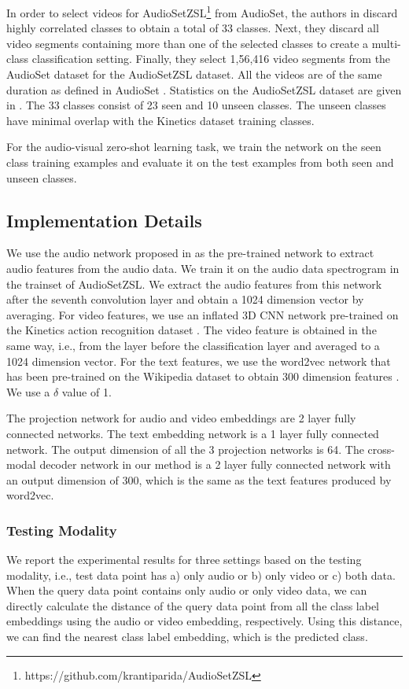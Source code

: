 \documentclass[10pt,twocolumn,letterpaper]{article}
\begin{document}
In order to select videos for AudioSetZSL\footnote{https://github.com/krantiparida/AudioSetZSL} from AudioSet, the authors in \cite{parida2020coordinated} discard highly correlated classes to obtain a total of 33 classes.  Next, they discard all video segments containing more than one of the selected classes to create a multi-class classification setting. Finally, they select 1,56,416 video segments from the AudioSet dataset for the AudioSetZSL dataset. All the videos are of the same duration as defined in AudioSet \cite{gemmeke2017audio}. Statistics on the AudioSetZSL dataset are given in \cite{parida2020coordinated}. The 33 classes consist of 23 seen and 10 unseen classes. The unseen classes have minimal overlap with the Kinetics dataset \cite{carreira2017quo} training classes. 

For the audio-visual zero-shot learning task, we train the network on the seen class training examples and evaluate it on the test examples from both seen and unseen classes.


\subsection{Implementation Details}
We use the audio network proposed in \cite{kumar2018knowledge} as the pre-trained network to extract audio features from the audio data. We train it on the audio data spectrogram in the trainset of AudioSetZSL. We extract the audio features from this network after the seventh convolution layer and obtain a 1024 dimension vector by averaging. For video features, we use an inflated 3D CNN network pre-trained on the Kinetics action recognition dataset \cite{carreira2017quo}. The video feature is obtained in the same way, i.e., from the layer before the classification layer and averaged to a 1024 dimension vector. For the text features, we use the word2vec network that has been pre-trained on the Wikipedia dataset to obtain 300 dimension features \cite{mikolov2017advances}. We use a $\delta$ value of 1.

The projection network for audio and video embeddings are 2 layer fully connected networks. The text embedding network is a 1 layer fully connected network. The output dimension of all the 3 projection networks is 64. The cross-modal decoder network in our method is a 2 layer fully connected network with an output dimension of 300, which is the same as the text features produced by word2vec. 


\subsubsection{Testing Modality}\label{sec:testmod}
We report the experimental results for three settings based on the testing modality, i.e., test data point has a) only audio or b) only video or c) both data.  When the query data point contains only audio or only video data, we can directly calculate the distance of the query data point from all the class label embeddings using the audio or video embedding, respectively. Using this distance, we can find the nearest class label embedding, which is the predicted class.  
\end{document}
